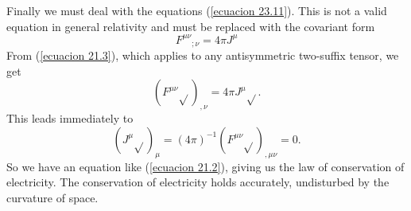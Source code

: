 Finally we must deal with the equations (\ref{ecuacion 23.11}). This is not a valid equation in general relativity and 
must be replaced with the covariant form
\begin{equation}
 \label{ecuacion 23.13}
 {F^{\mu\nu}}_{;\nu} = 4\pi J^\mu
\end{equation}
From (\ref{ecuacion 21.3}), which applies to any antisymmetric two-suffix tensor, we get
\[
 \left( F^{\mu\nu} \sqrt{} \right)_{,\nu} = 4 \pi J^\mu \sqrt{}.
\]
This leads immediately to
\[
 \left( J^\mu \sqrt{} \right)_{\mu} = (4\pi)^{-1} \left( F^{\mu\nu} \sqrt{} \right)_{,\mu\nu} = 0.
\]
So we have an equation like (\ref{ecuacion 21.2}), giving us the law of conservation of electricity. The conservation 
of electricity holds accurately, undisturbed by the curvature of space.


